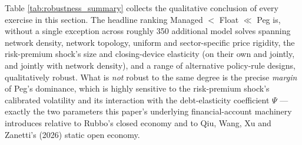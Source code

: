 \documentclass[12pt]{article}
\begin{document}
Table \ref{tab:robustness_summary} collects the qualitative conclusion of every exercise in this
section. The headline ranking Managed $<$ Float $\ll$ Peg is, without a single exception across
roughly 350 additional model solves spanning network density, network topology, uniform and
sector-specific price rigidity, the risk-premium shock's size and closing-device elasticity (on their
own and jointly, and jointly with network density), and a range of alternative policy-rule designs,
qualitatively robust. What is \emph{not} robust to the same degree is the precise \emph{margin} of
Peg's dominance, which is highly sensitive to the risk-premium shock's calibrated volatility and its
interaction with the debt-elasticity coefficient $\Psi$ --- exactly the two parameters this paper's
underlying financial-account machinery introduces relative to Rubbo's closed economy and to Qiu, Wang,
Xu and Zanetti's (2026) static open economy.
\end{document}

